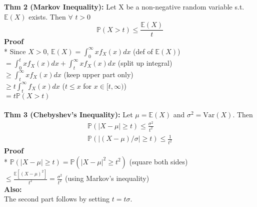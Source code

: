 \documentclass[10pt,twocolumn]{article}
\renewenvironment{proof}{{\bfseries Proof}}{\\}
\begin{document}
\textbf{Thm 2 (Markov Inequality):}
Let X be a non-negative random variable s.t. $\mathbb{E}(X)$ exists. Then $\forall$ $t>0$
\begin{equation}
    \mathbb{P}(X>t) \leq \frac{\mathbb{E}(X)}{t}
\end{equation}
\begin{proof}
    \mbox{}\\*
    Since $X>0$, $\mathbb{E}(X) = \int_{0}^{\infty}xf_{X}(x)dx$ \hfill (def of $\mathbb{E}(X)$) \\
    $= \int_{0}^{t}xf_{X}(x)dx + \int_{t}^{\infty}xf_{X}(x)dx$ \hfill (split up integral) \\
    $\geq \int_{t}^{\infty}xf_{X}(x)dx$ \hfill (keep upper part only) \\
    $\geq t\int_{t}^{\infty}f_{X}(x)dx$ \hfill ($t \leq x$ for $x \in [t,\infty)$) \\
    $ = t \mathbb{P}(X > t)$
\end{proof} \\

\textbf{Thm 3 (Chebyshev's Inequality):}
Let $\mu = \mathbb{E}(X)$ and $\sigma^{2} = \text{Var}(X)$. Then
\begin{gather}
    \mathbb{P}(|X-\mu| \geq t) \leq \frac{\sigma^{2}}{t^{2}} \\
    \mathbb{P}(|(X-\mu)/\sigma| \geq t) \leq \frac{1}{t^{2}}
\end{gather}
\begin{proof}
    \mbox{}\\*
    $\mathbb{P}(|X-\mu| \geq t) = \mathbb{P}(|X-\mu|^{2} \geq t^{2})$ \hfill (square both sides) \\
    $\leq \frac{\mathbb{E}[(X-\mu)^{2}]}{t^{2}} = \frac{\sigma^{2}}{t^{2}}$ \hfill (using Markov's inequality) \\
    \textbf{Also:} \\
    The second part follows by setting $t=t\sigma$.
\end{proof}
\end{document}
